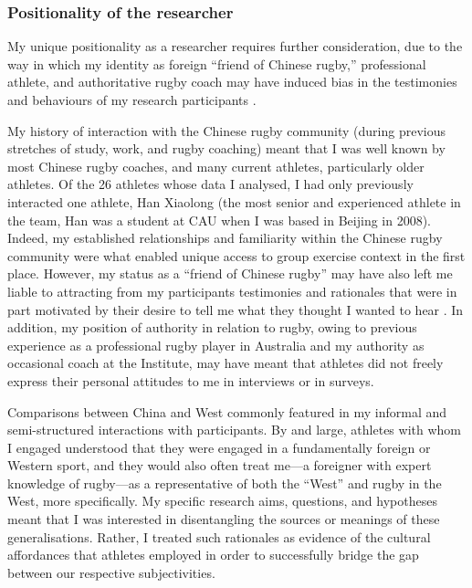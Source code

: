 \begin{CJK}{UTF8}{gbsn}
 

 \subsubsection{Positionality of the researcher}
 My unique positionality as a researcher requires further consideration, due to the way in which my identity as foreign ``friend of Chinese rugby,'' professional athlete, and authoritative rugby coach may have induced bias in the testimonies and behaviours of my research participants \citep[referred to in experimental psychology as ``demand characteristics''][]{McCambridge2012}.

 My history of interaction with the Chinese rugby community (during previous stretches of study, work, and rugby coaching) meant that I was well known by most Chinese rugby coaches, and many current athletes, particularly older athletes.  Of the 26 athletes whose data I analysed, I had only previously interacted one athlete, Han Xiaolong (the most senior and experienced athlete in the team, Han was a student at CAU when I was based in Beijing in 2008).  Indeed, my established relationships and familiarity within the Chinese rugby community were what enabled unique access to group exercise context in the first place.  However, my status as a ``friend of Chinese rugby'' may have also left me liable to attracting from my participants testimonies and rationales that were in part motivated by their desire to tell me what they thought I wanted to hear \citep{Clifford1986}.  In addition, my position of authority in relation to rugby, owing to previous experience as a professional rugby player in Australia and my authority as occasional coach at the Institute, may have meant that athletes did not freely express their personal attitudes to me in interviews or in surveys.

 Comparisons between China and West commonly featured in my informal and semi-structured interactions with participants.  By and large, athletes with whom I engaged understood that they were engaged in a fundamentally foreign or Western sport, and they would also often treat me---a foreigner with expert knowledge of rugby---as a representative of both the ``West'' and rugby in the West, more specifically.  My specific research aims, questions, and hypotheses meant that I was interested in disentangling the sources or meanings of these generalisations.  Rather, I treated such rationales as evidence of the cultural affordances that athletes employed in order to successfully bridge the gap between our respective subjectivities.


\end{CJK}
